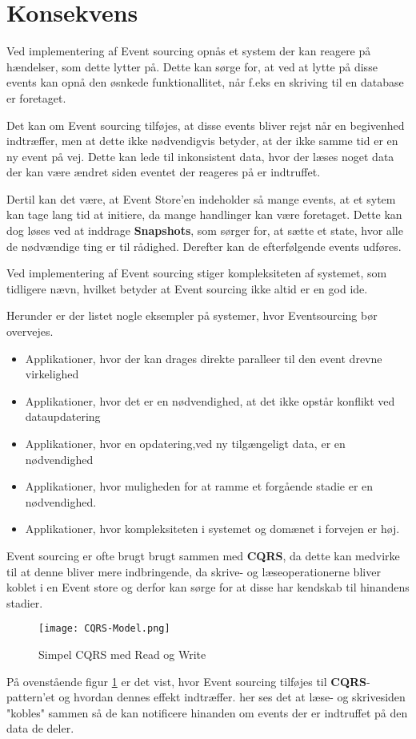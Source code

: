 \section{Konsekvens}
Ved implementering af Event sourcing opnås et system der kan reagere på hændelser, som dette lytter på. Dette kan sørge for, at ved at lytte på disse events kan opnå den øsnkede funktionallitet, når f.eks en skriving til en database er foretaget.

Det kan om Event sourcing tilføjes, at disse events bliver rejst når en begivenhed indtræffer, men at dette ikke nødvendigvis betyder, at der ikke samme tid er en ny event på vej. Dette kan lede til inkonsistent data, hvor der læses noget data der kan være ændret siden eventet der reageres på er indtruffet.

Dertil kan det være, at Event Store'en indeholder så mange events, at et sytem kan tage lang tid at initiere, da mange handlinger kan være foretaget. Dette kan dog løses ved at inddrage \textbf{Snapshots}, som sørger for, at sætte et state, hvor alle de nødvændige ting er til rådighed. Derefter kan de efterfølgende events udføres.

Ved implementering af Event sourcing stiger kompleksiteten af systemet, som tidligere nævn, hvilket betyder at Event sourcing ikke altid er en god ide. 

Herunder er der listet nogle eksempler på systemer, hvor Eventsourcing bør overvejes.
\begin{itemize}
	\item Applikationer, hvor der kan drages direkte paralleer til den event drevne virkelighed
	\item Applikationer, hvor det er en nødvendighed, at det ikke opstår konflikt ved dataupdatering 
	\item Applikationer, hvor en opdatering,ved ny tilgængeligt data, er en nødvendighed
	\item Applikationer, hvor muligheden for at ramme et forgående stadie er en nødvendighed.
	\item Applikationer, hvor kompleksiteten i systemet og domænet i forvejen er høj.
\end{itemize}

Event sourcing er ofte brugt brugt sammen med \textbf{CQRS}, da dette kan medvirke til at denne  bliver mere indbringende, da skrive- og læseoperationerne bliver koblet i en Event store og derfor kan sørge for at disse har kendskab til hinandens stadier.

\begin{figure}[H]
	\center
	\texttt{[image: CQRS-Model.png]}
	\caption{Simpel CQRS med Read og Write}
	\label{fig:cqrs-ES_model}
\end{figure}

På ovenstående figur \ref{fig:cqrs-ES_model} er det vist, hvor Event sourcing tilføjes til \textbf{CQRS}-pattern'et og hvordan dennes effekt indtræffer. her ses det at læse- og skrivesiden "kobles" sammen så de kan notificere hinanden om events der er indtruffet på den data de deler. 